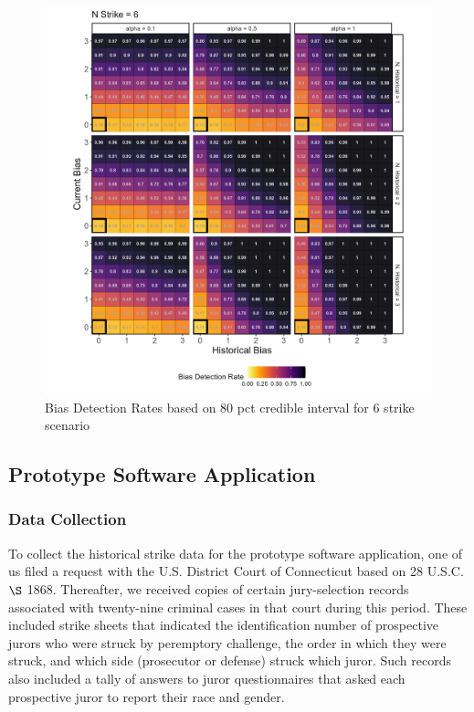 \documentclass[12pt]{article}
\begin{document}
\begin{figure}

{\centering \includegraphics[width=0.95\linewidth]{../figures/pp6_80CI} 

}

\caption{Bias Detection Rates based on 80 pct credible interval for 6 strike scenario}\label{fig:figbd806}
\end{figure}

\hypertarget{prototype-software-application}{%
\subsection{Prototype Software Application}\label{prototype-software-application}}

\hypertarget{data-collection}{%
\subsubsection{Data Collection}\label{data-collection}}

To collect the historical strike data for the prototype software application, one of us filed a request with the U.S. District Court of Connecticut based on 28 U.S.C. \(\S\) 1868. Thereafter, we received copies of certain jury-selection records associated with twenty-nine criminal cases in that court during this period. These included strike sheets that indicated the identification number of prospective jurors who were struck by peremptory challenge, the order in which they were struck, and which side (prosecutor or defense) struck which juror. Such records also included a tally of answers to juror questionnaires that asked each prospective juror to report their race and gender.
\end{document}
